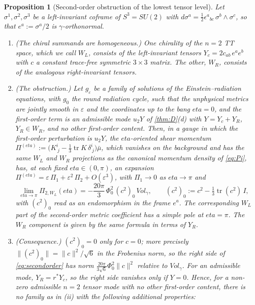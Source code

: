 \documentclass[11pt]{article}
\theoremstyle{canonmath}
\theoremstyle{canonpostulate}
\theoremstyle{canonproposition}
\theoremstyle{canonmath}
\newtheorem{proposition*}[theorem]{Proposition}
\theoremstyle{canonproposition}
\def\mathrm#1{#1}%
\def\eta{eta}%
\begin{document}
\begin{proposition*}[Second-order obstruction of the lowest tensor level]\label{prop:second}
Let $\sigma^1,\sigma^2,\sigma^3$ be a left-invariant coframe of $S^3 = SU(2)$ with $d\sigma^a = \tfrac12\epsilon^a{}_{bc}\,\sigma^b\wedge\sigma^c$, so that $e^a := \sigma^a/2$ is $\gamma$-orthonormal.
\begin{enumerate}[label=(\roman*)]
\item \emph{(The chiral summands are homogeneous.)} One chirality of the $n=2$ TT space, which we call $W_L$, consists of the left-invariant tensors $Y_c = 2c_{ab}\,e^a e^b$ with $c$ a constant trace-free symmetric $3\times3$ matrix. The other, $W_R$, consists of the analogous right-invariant tensors.
\item \emph{(The obstruction.)} Let $g_\varepsilon$ be a family of solutions of the Einstein--radiation equations, with $g_0$ the round radiation cycle, such that the unphysical metrics are jointly smooth in $\varepsilon$ and the coordinates up to the bang $\eta = 0$, and the first-order term is an admissible mode $u_2Y$ of \cref{thm:D}(d) with $Y = Y_c + Y_R$, $Y_R \in W_R$, and no other first-order content. Then, in a gauge in which the first-order perturbation is $u_2Y$, the $\eta$-oriented shear momentum $\Pi^{(\eta)} := \bigl(K^i_{\ j}-\tfrac13\operatorname{tr}K\,\delta^i_{\ j}\bigr)\bar\mu$, which vanishes on the background and has the same $W_L$ and $W_R$ projections as the canonical momentum density of \eqref{eq:Pi}, has, at each fixed $\eta\in(0,\pi)$, an expansion $\Pi^{(\eta)} = \varepsilon\,\Pi_1 + \varepsilon^2\,\Pi_2 + O(\varepsilon^3)$, with $\Pi_1\to0$ as $\eta\to\pi$ and
\begin{equation}
\lim_{\eta\to\pi}\Pi_{2,W_L}(\eta) = -\frac{20\pi}{3}\,\Phi_0^2\,(c^2)_0\,\mathrm{Vol}_\gamma, \qquad (c^2)_0 := c^2 - \tfrac13\operatorname{tr}(c^2)\,I,
\label{eq:secondorder}
\end{equation}
with $(c^2)_0$ read as an endomorphism in the frame $e^a$. The corresponding $W_L$ part of the second-order metric coefficient has a simple pole at $\eta = \pi$. The $W_R$ component is given by the same formula in terms of $Y_R$.
\item \emph{(Consequence.)} $(c^2)_0 = 0$ only for $c = 0$; more precisely $\|(c^2)_0\| = \|c\|^2/\sqrt6$ in the Frobenius norm, so the right side of \eqref{eq:secondorder} has norm $\tfrac{20\pi}{3\sqrt6}\Phi_0^2\|c\|^2$ relative to $\mathrm{Vol}_\gamma$. For an admissible mode, $Y_R = r^*Y_c$, so the right side vanishes only if $Y = 0$. Hence, for a non-zero admissible $n=2$ tensor mode with no other first-order content, there is no family as in (ii) with the following additional properties:

\end{enumerate}
\end{proposition*}
\end{document}

